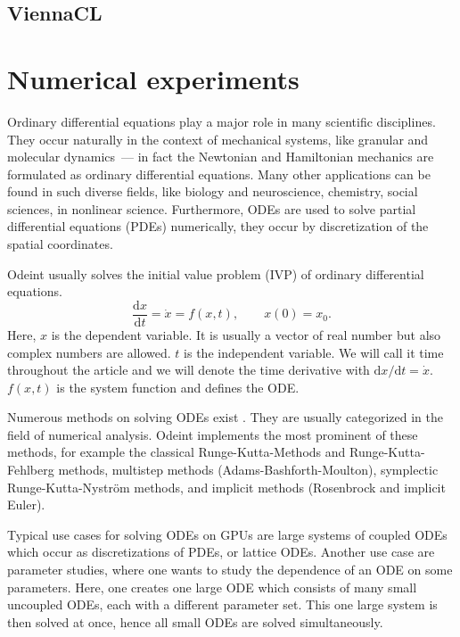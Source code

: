 \documentclass[1p]{elsarticle}
\newcommand {\de} {\mbox{d}}
\begin{document}
\subsection{ViennaCL}














\section{Numerical experiments}

Ordinary differential equations play a major role in many scientific
disciplines. They occur naturally in the context of mechanical
systems, like granular and molecular dynamics~--- in fact the Newtonian
and Hamiltonian mechanics are formulated as ordinary differential
equations. Many other applications can be found in such diverse
fields, like biology and neuroscience, chemistry, social sciences, in
nonlinear science. Furthermore, ODEs are used to solve partial
differential equations (PDEs) numerically, they occur by discretization of
the spatial coordinates.

Odeint usually solves the initial value problem (IVP) of ordinary differential
equations.
\begin{equation}
\frac{\de x}{\de t } = \dot{x} = f(x , t), \quad \quad x(0) =
x_0.
\label{eq:ode}
\end{equation}
Here, $x$ is the dependent variable. It is usually a vector of real
number but also complex numbers are allowed. $t$ is the independent
variable. We will call it time throughout the article and we will
denote the time derivative with $\de x / \de t = \dot{x}$. $f(x,t)$
is the system function and defines the ODE.

Numerous methods on solving ODEs exist \cite{HairerSolvingODEI,
HairerSolvingODEII, HairerGeometricNumericalIntegration2006}. They are usually
categorized in the field of numerical analysis. Odeint implements the most
prominent of these methods, for example the classical Runge-Kutta-Methods and
Runge-Kutta-Fehlberg methods, multistep methods (Adams-Bashforth-Moulton),
symplectic Runge-Kutta-Nystr\"om methods, and implicit methods (Rosenbrock and
implicit Euler).

Typical use cases for solving ODEs on GPUs are large systems of
coupled ODEs which occur as discretizations of PDEs, or lattice
ODEs. Another use case are parameter studies, where one wants to study
the dependence of an ODE on some parameters. Here, one creates one
large ODE which consists of many small uncoupled ODEs, each with a
different parameter set. This one large system is then solved at once,
hence all small ODEs are solved simultaneously.
\end{document}
